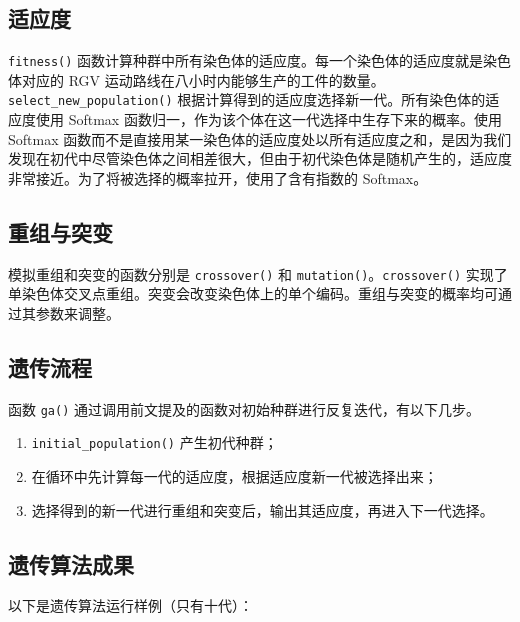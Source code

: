 \documentclass{cumcmthesis}
\begin{document}
	\subsection{适应度}

	\texttt{fitness()} 函数计算种群中所有染色体的适应度。每一个染色体的适应度就是染色体对应的 RGV 运动路线在八小时内能够生产的工件的数量。\texttt{select\_new\_population()} 根据计算得到的适应度选择新一代。所有染色体的适应度使用 Softmax 函数归一，作为该个体在这一代选择中生存下来的概率。使用 Softmax 函数而不是直接用某一染色体的适应度处以所有适应度之和，是因为我们发现在初代中尽管染色体之间相差很大，但由于初代染色体是随机产生的，适应度非常接近。为了将被选择的概率拉开，使用了含有指数的 Softmax。

	\subsection{重组与突变}

	模拟重组和突变的函数分别是 \texttt{crossover()} 和 \texttt{mutation()}。\texttt{crossover()} 实现了单染色体交叉点重组。突变会改变染色体上的单个编码。重组与突变的概率均可通过其参数来调整。

	\subsection{遗传流程}

	函数 \texttt{ga()} 通过调用前文提及的函数对初始种群进行反复迭代，有以下几步。
	\begin{enumerate}
		\item \texttt{initial\_population()} 产生初代种群；
		\item 在循环中先计算每一代的适应度，根据适应度新一代被选择出来；
		\item 选择得到的新一代进行重组和突变后，输出其适应度，再进入下一代选择。
	\end{enumerate}

	\subsection{遗传算法成果}

	以下是遗传算法运行样例（只有十代）：
	
\end{document}
